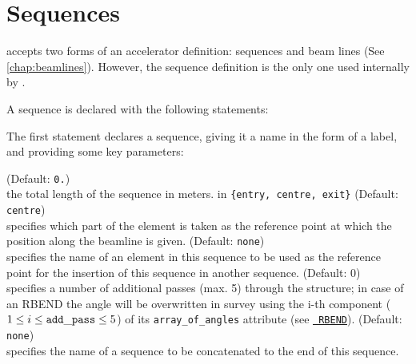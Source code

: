 
\chapter{Sequences}
\label{chap:sequence}

\madx accepts two forms of an accelerator definition: sequences and
beam lines (See \ref{chap:beamlines}). 
However, the sequence definition is the only one used internally by \madx.

A sequence is declared with the following statements:

The first statement declares a sequence, giving it a name in the form of
a label, and providing some key parameters: 

\begin{madlist}
    (Default: {\tt 0.})\\
     the total length of the sequence in meters. 
    in {\tt \{entry, centre, exit\}} (Default:
          {\tt centre}) \\
     specifies which part of the element is taken as the reference point 
     at which the position along the beamline is given.
    (Default: {\tt none})\\
   specifies the name of an element in this sequence to be used as the
   reference point for the insertion of this sequence in another
   sequence.
    (Default: 0)\\ 
     specifies a number of additional passes (max. 5) through the
     structure; in case of an RBEND the angle will be overwritten in  survey
     using the i-th component ($1 \le i \le {\tt add\_pass} \le 5$) of
     its {\tt array\_of\_angles} attribute (see \hyperref[bend-rbend]{\tt 
     RBEND}). 
    (Default: {\tt none})\\
     specifies the name of a sequence to be concatenated 
     to the end of this sequence.
\end{madlist}
 

